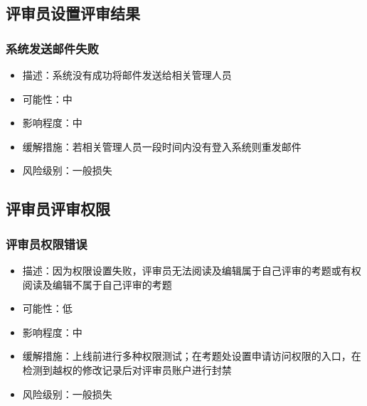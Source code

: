 \documentclass[hyperref, a4paper]{ctexart}
\providecommand{\tightlist}{%
  \setlength{\itemsep}{0pt}\setlength{\parskip}{0pt}}
\begin{document}
\hypertarget{ux8bc4ux5ba1ux5458ux8bbeux7f6eux8bc4ux5ba1ux7ed3ux679c}{%
\subsection{评审员设置评审结果}\label{ux8bc4ux5ba1ux5458ux8bbeux7f6eux8bc4ux5ba1ux7ed3ux679c}}

\hypertarget{ux7cfbux7edfux53d1ux9001ux90aeux4ef6ux5931ux8d25-2}{%
\subsubsection{系统发送邮件失败}\label{ux7cfbux7edfux53d1ux9001ux90aeux4ef6ux5931ux8d25-2}}

\begin{itemize}
\tightlist
\item
  描述：系统没有成功将邮件发送给相关管理人员
\item
  可能性：中
\item
  影响程度：中
\item
  缓解措施：若相关管理人员一段时间内没有登入系统则重发邮件
\item
  风险级别：一般损失
\end{itemize}

\hypertarget{ux8bc4ux5ba1ux5458ux8bc4ux5ba1ux6743ux9650-1}{%
\subsection{评审员评审权限}\label{ux8bc4ux5ba1ux5458ux8bc4ux5ba1ux6743ux9650-1}}

\hypertarget{ux8bc4ux5ba1ux5458ux6743ux9650ux9519ux8bef}{%
\subsubsection{评审员权限错误}\label{ux8bc4ux5ba1ux5458ux6743ux9650ux9519ux8bef}}

\begin{itemize}
\tightlist
\item
  描述：因为权限设置失败，评审员无法阅读及编辑属于自己评审的考题或有权阅读及编辑不属于自己评审的考题
\item
  可能性：低
\item
  影响程度：中
\item
  缓解措施：上线前进行多种权限测试；在考题处设置申请访问权限的入口，在检测到越权的修改记录后对评审员账户进行封禁
\item
  风险级别：一般损失
\end{itemize}
\end{document}
